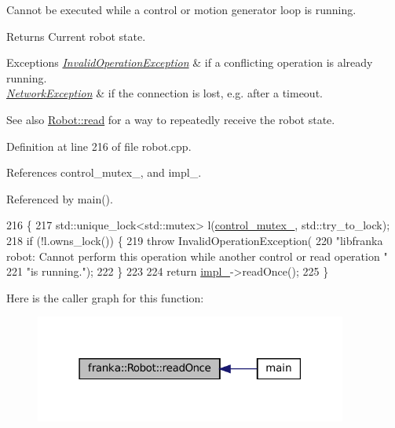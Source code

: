 Cannot be executed while a control or motion generator loop is running.

\begin{DoxyReturn}{Returns}
Current robot state.
\end{DoxyReturn}

\begin{DoxyExceptions}{Exceptions}
{\em \hyperlink{structfranka_1_1InvalidOperationException}{Invalid\+Operation\+Exception}} & if a conflicting operation is already running. \\
\hline
{\em \hyperlink{structfranka_1_1NetworkException}{Network\+Exception}} & if the connection is lost, e.\+g. after a timeout.\\
\hline
\end{DoxyExceptions}
\begin{DoxySeeAlso}{See also}
\hyperlink{classfranka_1_1Robot_a82f85eed20426901a7e77b66c041664b}{Robot\+::read} for a way to repeatedly receive the robot state. 
\end{DoxySeeAlso}


Definition at line 216 of file robot.\+cpp.



References control\+\_\+mutex\+\_\+, and impl\+\_\+.



Referenced by main().


\begin{DoxyCode}
216                            \{
217   std::unique\_lock<std::mutex> l(\hyperlink{classfranka_1_1Robot_a719ad1fab76f8edfc9f6f761671c1375}{control\_mutex\_}, std::try\_to\_lock);
218   \textcolor{keywordflow}{if} (!l.owns\_lock()) \{
219     \textcolor{keywordflow}{throw} InvalidOperationException(
220         \textcolor{stringliteral}{"libfranka robot: Cannot perform this operation while another control or read operation "}
221         \textcolor{stringliteral}{"is running."});
222   \}
223 
224   \textcolor{keywordflow}{return} \hyperlink{classfranka_1_1Robot_aca155054184e5b6478942fd6a1b82ba4}{impl\_}->readOnce();
225 \}
\end{DoxyCode}
Here is the caller graph for this function\+:
\nopagebreak
\begin{figure}[H]
\begin{center}
\leavevmode
\includegraphics[width=291pt]{classfranka_1_1Robot_a7ea7074a07b63fcf6933e97b078c7168_icgraph}
\end{center}
\end{figure}
\mbox{\label{classfranka_1_1Robot_a7cc1883114afecff80259615e40d9af8}} 
